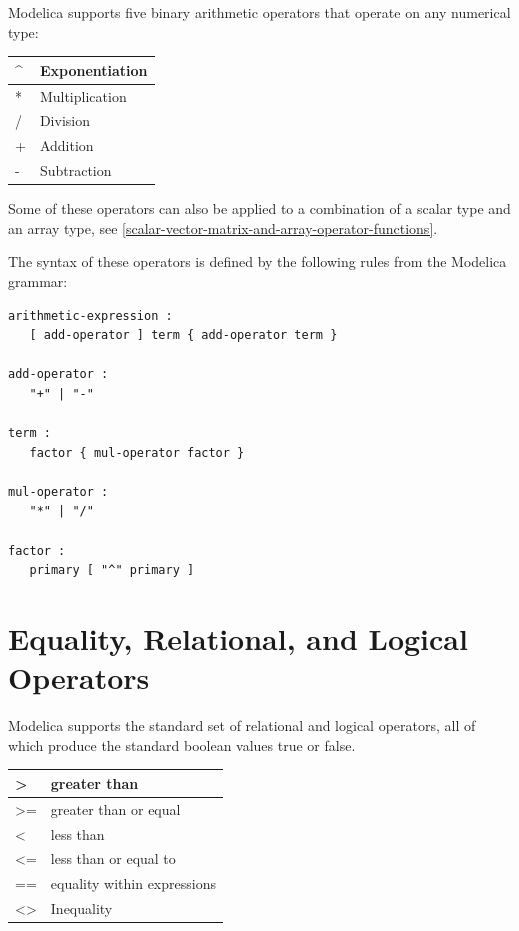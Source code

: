 \documentclass[10pt,a4paper]{report}
\def\doublelabel#1{\label{#1}\hypertarget{#1}{}}
\begin{document}
Modelica supports five binary arithmetic operators that operate on any
numerical type:


\begin{longtable}[c]{@{}ll@{}}
\^{} & Exponentiation\\ \hline
* & Multiplication\\ \hline
/ & Division\\ \hline
+ & Addition\\ \hline
- & Subtraction\\ \hline
\end{longtable}

Some of these operators can also be applied to a combination of a scalar
type and an array type, see \ref{scalar-vector-matrix-and-array-operator-functions}.

The syntax of these operators is defined by the following rules from the
Modelica grammar:

\begin{lstlisting}[language=grammar]
arithmetic-expression :
   [ add-operator ] term { add-operator term }

add-operator :
   "+" | "-"
   
term :
   factor { mul-operator factor }

mul-operator :
   "*" | "/"
   
factor :
   primary [ "^" primary ]
\end{lstlisting}

\section{Equality, Relational, and Logical Operators}\doublelabel{equality-relational-and-logical-operators}

Modelica supports the standard set of relational and logical operators,
all of which produce the standard boolean values true or false.

\begin{longtable}[]{@{}ll@{}}
\textgreater{} & greater than\\ \hline
\textgreater{}= & greater than or equal\\ \hline
\textless{} & less than\\ \hline
\textless{}= & less than or equal to\\ \hline
== & equality within expressions\\ \hline
\textless{}\textgreater{} & Inequality\\ \hline
\end{longtable}
\end{document}
